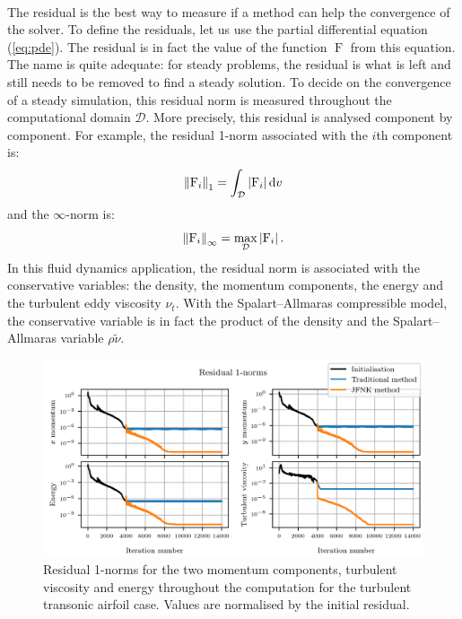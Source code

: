        \paragraph{}
        The residual is the best way to measure if a method can help the convergence of the solver.
        To define the residuals, let us use the partial differential equation (\ref{eq:pde}).
        The residual is in fact the value of the function $\operatorname{F}$ from this equation.
        The name is quite adequate: for steady problems, the residual is what is left and still needs to be removed to find a steady solution.
        To decide on the convergence of a steady simulation, this residual norm is measured throughout the computational domain $\mathcal{D}$.
        More precisely, this residual is analysed component by component.
        For example, the residual 1-norm associated with the $i$th component is:
        \begin{equation}
          \norm[1]{\operatorname{F}_i} = \int_\mathcal{D} \left| \operatorname{F}_i \right| \mathrm{d}v
        \end{equation}
        and the $\infty$-norm is:
        \begin{equation}
          \norm[\infty]{\operatorname{F}_i} = \max_\mathcal{D} \left| \operatorname{F}_i \right| .
        \end{equation}
        In this fluid dynamics application, the residual norm is associated with the conservative variables: the density, the momentum components, the energy and the turbulent eddy viscosity $\nu_t$.
        With the Spalart--Allmaras compressible model, the conservative variable is in fact the product of the density and the Spalart--Allmaras variable $\rho \tilde{\nu}$.

        \begin{figure}
          \centering
          \includegraphics{figures/rae_residuals.png}
          \caption{Residual 1-norms for the two momentum components, turbulent viscosity and energy throughout the computation for the turbulent transonic airfoil case.
          Values are normalised by the initial residual.}
          \label{fig:rae_residuals}
        \end{figure}

